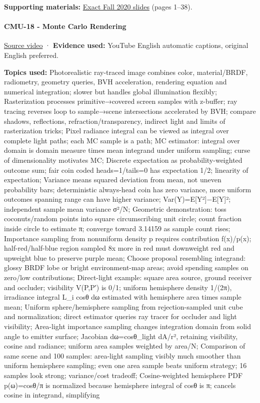 \textbf{Supporting materials:} \href{https://15462.courses.cs.cmu.edu/fall2020content/lectures/17_numericalintegration/17_numericalintegration_slides.pdf}{Exact Fall 2020 slides} (pages 1--38).

\paragraph{CMU-18 - Monte Carlo Rendering}\label{cmu-18---monte-carlo-rendering}

\href{https://www.youtube.com/watch?v=FUZJNlRqrAc}{Source video} · \textbf{Evidence used:} YouTube English automatic captions, original English preferred.

\textbf{Topics used:} Photorealistic ray-traced image combines color, material/BRDF, radiometry, geometry queries, BVH acceleration, rendering equation and numerical integration; slower but handles global illumination flexibly; Rasterization processes primitive→covered screen samples with z-buffer; ray tracing reverses loop to sample→scene intersections accelerated by BVH; compare shadows, reflections, refraction/transparency, indirect light and limits of rasterization tricks; Pixel radiance integral can be viewed as integral over complete light paths; each MC sample is a path; MC estimator: integral over domain is domain measure times mean integrand under uniform sampling; curse of dimensionality motivates MC; Discrete expectation as probability-weighted outcome sum; fair coin coded heads=1/tails=0 has expectation 1/2; linearity of expectation; Variance means squared deviation from mean, not uneven probability bars; deterministic always-head coin has zero variance, more uniform outcomes spanning range can have higher variance; Var(Y)=E{[}Y²{]}−E{[}Y{]}²; independent sample mean variance σ²/N; Geometric demonstration: toss coconuts/random points into square circumscribing unit circle; count fraction inside circle to estimate π; converge toward 3.14159 as sample count rises; Importance sampling from nonuniform density p requires contribution f(x)/p(x); half-red/half-blue region sampled 8x more in red must downweight red and upweight blue to preserve purple mean; Choose proposal resembling integrand: glossy BRDF lobe or bright environment-map areas; avoid spending samples on zero/low contributions; Direct-light example: square area source, ground receiver and occluder; visibility V(P,P′) is 0/1; uniform hemisphere density 1/(2π), irradiance integral L\_i cosθ dω estimated with hemisphere area times sample mean; Uniform sphere/hemisphere sampling from rejection-sampled unit cube and normalization; direct estimator queries ray tracer for occluder and light visibility; Area-light importance sampling changes integration domain from solid angle to emitter surface; Jacobian dω=cosθ\_light dA/r², retaining visibility, cosine and radiance; uniform area samples weighted by area/N; Comparison of same scene and 100 samples: area-light sampling visibly much smoother than uniform hemisphere sampling; even one area sample beats uniform strategy; 16 samples look strong; variance/cost tradeoff; Cosine-weighted hemisphere PDF p(ω)=cosθ/π is normalized because hemisphere integral of cosθ is π; cancels cosine in integrand, simplifying 